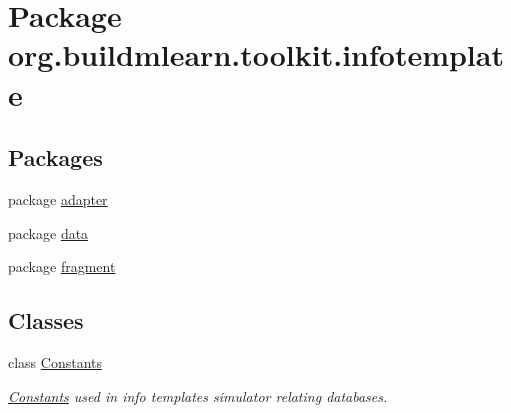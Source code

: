 \hypertarget{namespaceorg_1_1buildmlearn_1_1toolkit_1_1infotemplate}{}\section{Package org.\+buildmlearn.\+toolkit.\+infotemplate}
\label{namespaceorg_1_1buildmlearn_1_1toolkit_1_1infotemplate}
\subsection*{Packages}
\begin{DoxyCompactItemize}
\item 
package \hyperlink{namespaceorg_1_1buildmlearn_1_1toolkit_1_1infotemplate_1_1adapter}{adapter}
\item 
package \hyperlink{namespaceorg_1_1buildmlearn_1_1toolkit_1_1infotemplate_1_1data}{data}
\item 
package \hyperlink{namespaceorg_1_1buildmlearn_1_1toolkit_1_1infotemplate_1_1fragment}{fragment}
\end{DoxyCompactItemize}
\subsection*{Classes}
\begin{DoxyCompactItemize}
\item 
class \hyperlink{classorg_1_1buildmlearn_1_1toolkit_1_1infotemplate_1_1Constants}{Constants}
\begin{DoxyCompactList}\small\item\em \hyperlink{classorg_1_1buildmlearn_1_1toolkit_1_1infotemplate_1_1Constants}{Constants} used in info template\textquotesingle{}s simulator relating databases. \end{DoxyCompactList}\end{DoxyCompactItemize}
